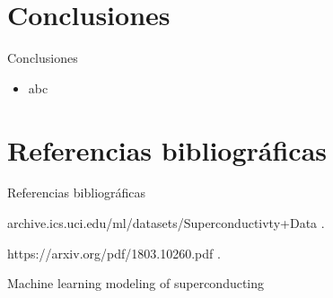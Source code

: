 \documentclass[11pt]{beamer}
\begin{document}
\section{Conclusiones}

\begin{frame}{Conclusiones}
	\begin{itemize}
		\item abc
	\end{itemize}
\end{frame}


\section{Referencias bibliográficas}

\begin{frame}{Referencias bibliográficas}
	\begin{thebibliography}{10}

		\beamertemplateonlinebibitems %
		archive.ics.uci.edu/ml/datasets/Superconductivty+Data
		.

		\beamertemplateonlinebibitems %
		https://arxiv.org/pdf/1803.10260.pdf
		.

		\beamertemplatearticlebibitems %
		Machine learning modeling of superconducting


	\end{thebibliography}
\end{frame}
\end{document}
